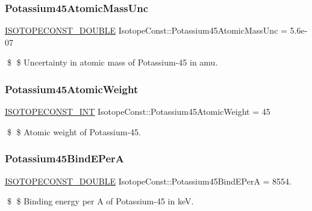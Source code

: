 \subsubsection{\texorpdfstring{Potassium45\+Atomic\+Mass\+Unc}{Potassium45AtomicMassUnc}}
{\footnotesize\ttfamily \mbox{\hyperlink{group___isotope_const-_macros_ga8f45a7272ce02c0b4c65c44636ed719a}{I\+S\+O\+T\+O\+P\+E\+C\+O\+N\+S\+T\+\_\+\+D\+O\+U\+B\+LE}} Isotope\+Const\+::\+Potassium45\+Atomic\+Mass\+Unc = 5.\+6e-\/07}

\$ \$ Uncertainty in atomic mass of Potassium-\/45 in amu. \mbox{\label{group___isotope_const-_potassium-_k45_gaa9fdc5bc26ddb42639f1bc5aac03b3cb}} 
\subsubsection{\texorpdfstring{Potassium45\+Atomic\+Weight}{Potassium45AtomicWeight}}
{\footnotesize\ttfamily \mbox{\hyperlink{group___isotope_const-_macros_ga5f18360b3e99483a35c32d789e62621c}{I\+S\+O\+T\+O\+P\+E\+C\+O\+N\+S\+T\+\_\+\+I\+NT}} Isotope\+Const\+::\+Potassium45\+Atomic\+Weight = 45}

\$ \$ Atomic weight of Potassium-\/45. \mbox{\label{group___isotope_const-_potassium-_k45_gab553fef1ed3f6538f872302d9aad01eb}} 
\subsubsection{\texorpdfstring{Potassium45\+Bind\+E\+PerA}{Potassium45BindEPerA}}
{\footnotesize\ttfamily \mbox{\hyperlink{group___isotope_const-_macros_ga8f45a7272ce02c0b4c65c44636ed719a}{I\+S\+O\+T\+O\+P\+E\+C\+O\+N\+S\+T\+\_\+\+D\+O\+U\+B\+LE}} Isotope\+Const\+::\+Potassium45\+Bind\+E\+PerA = 8554.}

\$ \$ Binding energy per A of Potassium-\/45 in keV. \mbox{\label{group___isotope_const-_potassium-_k45_gaa9046560227a56c0e3d890300488c9c9}} 
